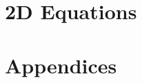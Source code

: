 \documentclass[subfooter, backcover]{mooiman_report}
\begin{document}
\part{2D Equations}


\printallbibliography
\part{Appendices}
\appendix






%
\end{document}
